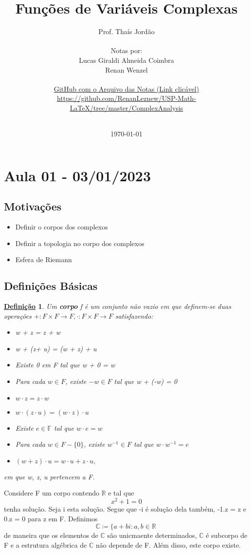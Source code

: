 \documentclass{article}
\title{Fun\c c\~oes de Vari\'aveis Complexas}
\author{Prof. Tha\'is Jord\~ao\\
  \vspace{2cm}\\
  Notas por:\\
  Lucas Giraldi Almeida Coimbra\\
  Renan Wenzel\\
  \vspace{4cm}\\
  \href{https://github.com/RenanLeznew/USP-Math-LaTeX/tree/master/ComplexAnalysis}{GitHub com o Arquivo das Notas (Link clic\'avel)}\\
  \url{https://github.com/RenanLeznew/USP-Math-LaTeX/tree/master/ComplexAnalysis}\\
  \vspace{4cm}\\
}
\date{\today}
\newtheorem*{def*}{\underline{Defini\c c\~ao}}
\begin{document}
\maketitle
\newpage
\tableofcontents
\newpage

\section{Aula 01 - 03/01/2023}
\subsection{Motiva\c c\~oes}
\begin{itemize}
  \item Definir o corpos dos complexos
  \item Definir a topologia no corpo dos complexos
  \item Esfera de Riemann
\end{itemize}

\subsection{Defini\c c\~oes B\'asicas}
\begin{def*}
  Um \textbf{corpo} f \'e um conjunto n\~ao vazio em que definem-se duas opera\c c\~oes $+:F\times{F}\rightarrow F, \cdot:F\times{F}\rightarrow F$ satisfazendo:
  \begin{itemize}
    \item[i)] w + z = z + w
    \item[ii)] w + (z+ u) = (w + z) + u
    \item[iii)] Existe 0 em F tal que w + 0 = w
    \item[iv)] Para cada $w\in F$, existe $-w \in F$ tal que w + (-w) = 0
    \item[v)] $w\cdot z = z\cdot w$
    \item[vi)] $w\cdot(z\cdot u) = (w\cdot z)\cdot u$
    \item[vii)] Existe $e\in \mathbb{F}$ tal que $w\cdot{e} = w$
    \item[viii)] Para cada $w\in{F-\{0\}}$, existe $w ^{-1}\in{F}$ tal que $w\cdot w ^{-1} = e$
    \item[ix)] $(w+z)\cdot{u} = w\cdot u + z\cdot u,$
  \end{itemize}
  em que w, z, u pertencem a F.
\end{def*}
Considere F um corpo contendo $\mathbb{R}$ e tal que 
$$
x ^{2} + 1 = 0
$$
tenha solu\c c\~ao. Seja i esta solu\c c\~ao. Segue que -i \'e solu\c c\~ao dela tamb\'em, -1.z = z e 0.z = 0 para z em F. Definimos
$$
\mathbb{C}\coloneqq  \{a + bi: a, b\in \mathbb{R}\,
  $$
  de maneira que os elementos de $\mathbb{C}$ s\~ao unicmaente determinados, $\mathbb{C}$ \'e subcorpo de F e a estrutura 
  alg\'ebrica de $\mathbb{C}$ n\~ao depende de F. Al\'em disso, este corpo existe.
\end{document}
